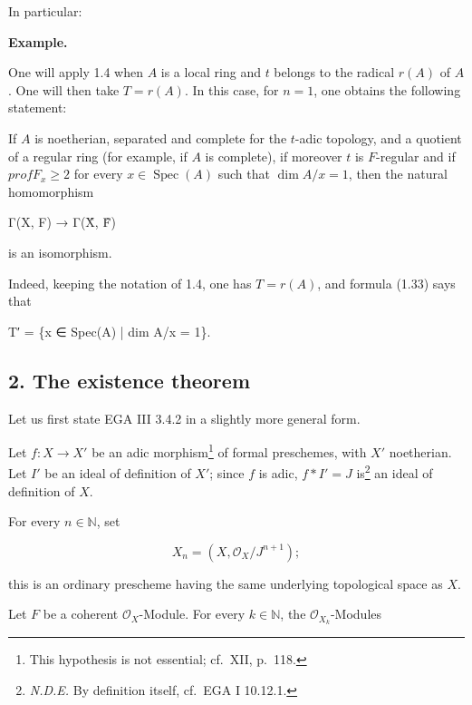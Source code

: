 \documentclass[
]{article}
\newenvironment{Shaded}{}{}
\newcommand{\NormalTok}[1]{#1}
\begin{document}
In particular:

\textbf{Example.}

One will apply 1.4 when \(A\) is a local ring and \(t\) belongs to the
radical \(r(A)\) of \(A\). One will then take \(T = {r(A)}\). In this
case, for \(n = 1\), one obtains the following statement:

If \(A\) is noetherian, separated and complete for the \(t\)-adic
topology, and a quotient of a regular ring (for example, if \(A\) is
complete), if moreover \(t\) is \(F\)-regular and if
\(prof F_{x} \geqslant 2\) for every \(x \in \operatorname{Spec}(A)\)
such that \(\dim A/x = 1\), then the natural homomorphism

\begin{Shaded}
\begin{Highlighting}[]
\NormalTok{Γ(X, F) → Γ(X̂, F̂)}
\end{Highlighting}
\end{Shaded}

is an isomorphism.

Indeed, keeping the notation of 1.4, one has \(T = {r(A)}\), and formula
(1.33) says that

\begin{Shaded}
\begin{Highlighting}[]
\NormalTok{T′ = \{x ∈ Spec(A) | dim A/x = 1\}.}
\end{Highlighting}
\end{Shaded}

\subsection{2. The existence theorem}\label{the-existence-theorem}

Let us first state EGA III 3.4.2 in a slightly more general form.

Let \(f: X \to X'\) be an adic morphism\footnote{This hypothesis is not
  essential; cf.~XII, p.~118.} of formal preschemes, with \(X'\)
noetherian. Let \(I'\) be an ideal of definition of \(X'\); since \(f\)
is adic, \(f*I' = J\) is\footnote{\emph{N.D.E.} By definition itself,
  cf.~EGA I 10.12.1.} an ideal of definition of \(X\).

For every \(n \in \mathbb{N}\), set

\[
X_{n} = (X, \mathcal{O}_{X}/J^{n+1});
\]

this is an ordinary prescheme having the same underlying topological
space as \(X\).

Let \(F\) be a coherent \(\mathcal{O}_{X}\)-Module. For every
\(k \in \mathbb{N}\), the \(\mathcal{O}_{X_{k}}\)-Modules
\end{document}
